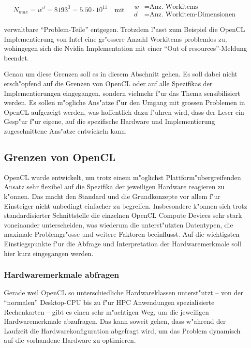 \begin{refsection}
\[
	N_{max} = w^d = 8193^{3} = 5.50 \cdot 10^{11} \quad\textrm{mit}\quad
	\begin{aligned}
		w &= \textrm{Anz. Workitems}\\
		d &= \textrm{Anz. Workitem-Dimensionen}
	\end{aligned}
\]

\noindent verwaltbare ``Problem-Teile'' entgegen. Trotzdem l"asst zum Beispiel
die OpenCL Implementierung von Intel eine gr"ossere Anzahl Workitems problemlos
zu, wohingegen sich die Nvidia Implementation mit einer ``Out of
resources''-Meldung beendet.

Genau um diese Grenzen soll es in diesem Abschnitt gehen. Es soll dabei nicht
ersch"opfend auf die Grenzen von OpenCL oder auf alle Spezifikas der
Implementierungen eingegangen, sondern vielmehr f"ur das Thema sensibilisiert
werden. Es sollen m"ogliche Ans"atze f"ur den Umgang mit grossen Problemen in
OpenCL aufgezeigt werden, was hoffentlich dazu f"uhren wird, dass der Leser ein
Gesp"ur f"ur eigene, auf die spezifische Hardware und Implementierung
zugeschnittene Ans"atze entwickeln kann.


\subsection{Grenzen von OpenCL}

OpenCL wurde entwickelt, um trotz einem m"oglichst Plattform"ubergreifenden
Ansatz sehr flexibel auf die Spezifika der jeweiligen Hardware reagieren zu
k"onnen. Das macht den Standard und die Grundkonzepte vor allem f"ur Einsteiger
nicht unbedingt einfacher zu begreifen. Insbesondere k"onnen sich trotz
standardisierter Schnittstelle die einzelnen OpenCL Compute Devices sehr stark
voneinander unterscheiden, was wiederum die unterst"utzten Datentypen, die
maximale Problemgr"osse und weitere Faktoren beeinflusst. Auf die wichtigsten
Einstiegspunkte f"ur die Abfrage und Interpretation der Hardwaremerkmale soll
hier kurz eingegangen werden.


\subsubsection{Hardwaremerkmale abfragen}

Gerade weil OpenCL so unterschiedliche Hardwareklassen unterst"utzt -- von der
``normalen'' Desktop-CPU bis zu f"ur HPC Anwendungen spezialisierte Rechenkarten
-- gibt es einen sehr m"achtigen Weg, um die jeweiligen Hardwaremerkmale
abzufragen.  Das kann soweit gehen, dass w"ahrend der Laufzeit die
Hardwarekonfiguration abgefragt wird, um das Problem dynamisch auf die
vorhandene Hardware zu optimieren.


\end{refsection}
